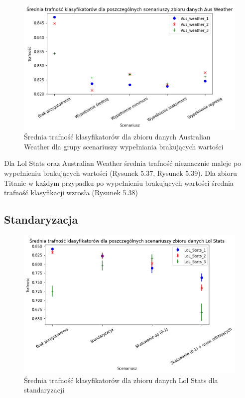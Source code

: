 \documentclass{book}
\begin{document}
\begin{figure}[H]
    \centerline{\includegraphics[scale=0.8]{Aus_Weather_Avg_Wypełnienie_brakujących}}
    \centering
    \caption{Średnia trafność klasyfikatorów dla zbioru danych Australian Weather 
    dla grupy scenariuszy wypełniania brakujących wartości}
    \end{figure}


    Dla Lol Stats oraz Australian Weather średnia trafność nieznacznie maleje po wypełnieniu brakujących wartości (Rysunek 5.37, Rysunek 5.39). 
    Dla zbioru Titanic w każdym przypadku po wypełnieniu brakujących wartości średnia trafność klasyfikacji wzrosła (Rysunek 5.38)


\subsection{Standaryzacja}

\begin{figure}[H]
    \centerline{\includegraphics[scale=0.8]{Lol_Stats_Avg_Standaryzacja}}
    \centering
    \caption{Średnia trafność klasyfikatorów dla zbioru danych Lol Stats 
    dla standaryzacji}
    \end{figure}
\end{document}
